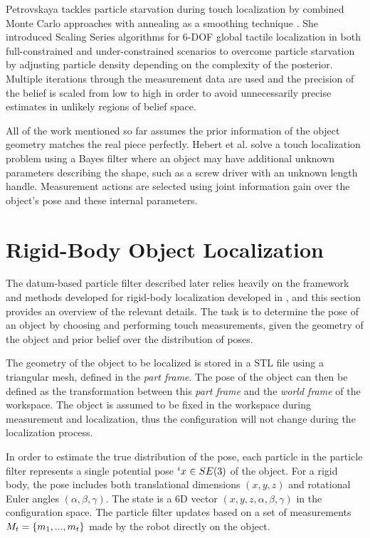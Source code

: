 \documentclass[../thesis.tex]{subfiles}
\begin{document}
Petrovskaya tackles particle starvation during touch localization by combined Monte Carlo approaches with annealing as a smoothing technique \cite{Petrovskaya2011}. 
She introduced Scaling Series algorithms for 6-DOF global tactile localization in both full-constrained and under-constrained scenarios to overcome particle starvation by adjusting particle density depending on the complexity of the posterior. 
Multiple iterations through the measurement data are used and the precision of the belief is scaled from low to high in order to avoid unnecessarily precise estimates in unlikely regions of belief space. 


All of the work mentioned so far assumes the prior information of the object geometry matches the real piece perfectly. 
Hebert et al. \cite{Hebert2013} solve a touch localization problem using a Bayes filter where an object may have additional unknown parameters describing the shape, such as a screw driver with an unknown length handle.
Measurement actions are selected using joint information gain over the object's pose and these internal parameters.



\section{Rigid-Body Object Localization}\label{sec:rigid_body}

The datum-based particle filter described later relies heavily on the framework and methods developed for rigid-body localization developed in \cite{Saund2017}, and this section provides an overview of the relevant details. 
The task is to determine the pose of an object by choosing and performing touch measurements, given the geometry of the object and prior belief over the distribution of poses.

The geometry of the object to be localized is stored in a STL file using a triangular mesh, defined in the \textit{part frame}. The pose of the object can then be defined as the transformation between this \textit{part frame} and the \textit{world frame} of the workspace. 
The object is assumed to be fixed in the workspace during measurement and localization, thus the configuration will not change during the localization process.

In order to estimate the true distribution of the pose, each particle in the particle filter represents a single potential pose $\particle[][i] \in SE(3)$ of the object. For a rigid body, the pose includes both translational dimensions $(x,y,z)$ and rotational Euler angles $(\alpha, \beta, \gamma)$. The state is a 6D vector $(x,y,z, \alpha, \beta, \gamma)$ in the configuration space. The particle filter updates based on a set of measurements $M_t = \{m_1, ..., m_t\}$ made by the robot directly on the object. 
\end{document}
